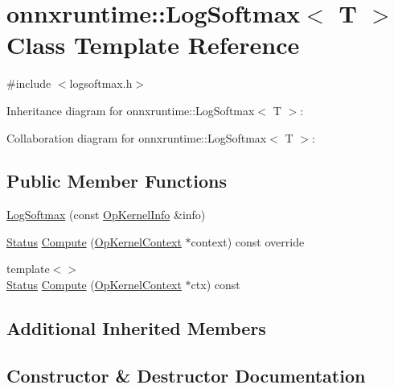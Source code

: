 \hypertarget{classonnxruntime_1_1LogSoftmax}{}\section{onnxruntime\+:\+:Log\+Softmax$<$ T $>$ Class Template Reference}
\label{classonnxruntime_1_1LogSoftmax}


{\ttfamily \#include $<$logsoftmax.\+h$>$}



Inheritance diagram for onnxruntime\+:\+:Log\+Softmax$<$ T $>$\+:


Collaboration diagram for onnxruntime\+:\+:Log\+Softmax$<$ T $>$\+:
\subsection*{Public Member Functions}
\begin{DoxyCompactItemize}
\item 
\mbox{\hyperlink{classonnxruntime_1_1LogSoftmax_aeea6b40991850c103ee0632e42e7efa4}{Log\+Softmax}} (const \mbox{\hyperlink{classonnxruntime_1_1OpKernelInfo}{Op\+Kernel\+Info}} \&info)
\item 
\mbox{\hyperlink{classonnxruntime_1_1common_1_1Status}{Status}} \mbox{\hyperlink{classonnxruntime_1_1LogSoftmax_a869e5d589c9bca42347e93b85113c053}{Compute}} (\mbox{\hyperlink{classonnxruntime_1_1OpKernelContext}{Op\+Kernel\+Context}} $\ast$context) const override
\item 
{\footnotesize template$<$$>$ }\\\mbox{\hyperlink{classonnxruntime_1_1common_1_1Status}{Status}} \mbox{\hyperlink{classonnxruntime_1_1LogSoftmax_a4cc201ceb477725a9137cada2ee2ad89}{Compute}} (\mbox{\hyperlink{classonnxruntime_1_1OpKernelContext}{Op\+Kernel\+Context}} $\ast$ctx) const
\end{DoxyCompactItemize}
\subsection*{Additional Inherited Members}


\subsection{Constructor \& Destructor Documentation}
\mbox{\label{classonnxruntime_1_1LogSoftmax_aeea6b40991850c103ee0632e42e7efa4}} 
